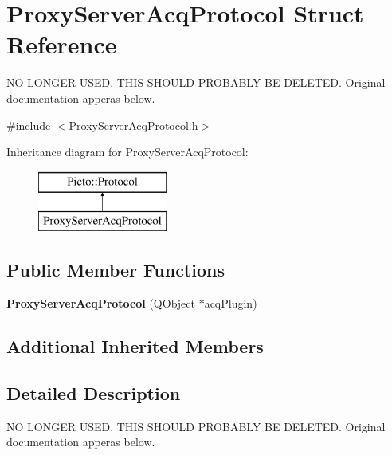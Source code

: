 \hypertarget{struct_proxy_server_acq_protocol}{\section{Proxy\-Server\-Acq\-Protocol Struct Reference}
\label{struct_proxy_server_acq_protocol}
}


N\-O L\-O\-N\-G\-E\-R U\-S\-E\-D. T\-H\-I\-S S\-H\-O\-U\-L\-D P\-R\-O\-B\-A\-B\-L\-Y B\-E D\-E\-L\-E\-T\-E\-D. Original documentation apperas below.  




{\ttfamily \#include $<$Proxy\-Server\-Acq\-Protocol.\-h$>$}

Inheritance diagram for Proxy\-Server\-Acq\-Protocol\-:\begin{figure}[H]
\begin{center}
\leavevmode
\includegraphics[height=2.000000cm]{struct_proxy_server_acq_protocol}
\end{center}
\end{figure}
\subsection*{Public Member Functions}
\begin{DoxyCompactItemize}
\item 
\hypertarget{struct_proxy_server_acq_protocol_a09576d9eba5a248fdfcb681b8f0bf683}{{\bfseries Proxy\-Server\-Acq\-Protocol} (Q\-Object $\ast$acq\-Plugin)}\label{struct_proxy_server_acq_protocol_a09576d9eba5a248fdfcb681b8f0bf683}

\end{DoxyCompactItemize}
\subsection*{Additional Inherited Members}


\subsection{Detailed Description}
N\-O L\-O\-N\-G\-E\-R U\-S\-E\-D. T\-H\-I\-S S\-H\-O\-U\-L\-D P\-R\-O\-B\-A\-B\-L\-Y B\-E D\-E\-L\-E\-T\-E\-D. Original documentation apperas below. 

